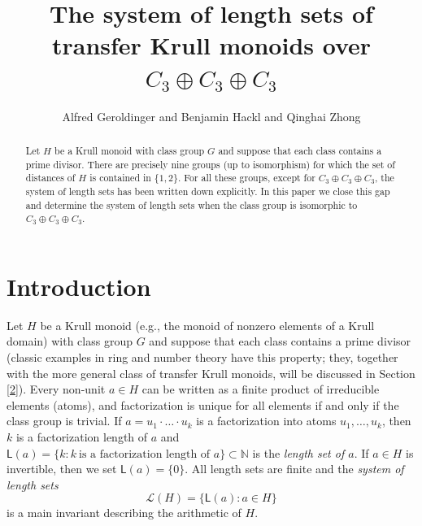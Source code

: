 \documentclass[a4paper, 10pt]{amsart}
\theoremstyle{plain}
\theoremstyle{definition}
\theoremstyle{definition}
\newcommand{\N}{\mathbb N}
\numberwithin{equation}{section}
\begin{document}
\title[The system of  length sets of transfer Krull monoids over $C_3 \oplus C_3 \oplus C_3$]{The system of  length sets of \\ transfer Krull monoids over $C_3 \oplus C_3 \oplus C_3$}

\author{Alfred Geroldinger and  Benjamin Hackl and Qinghai Zhong}

\address{University of Graz, NAWI Graz\\
Department of Mathematics and Scientific Computing\\
Heinrichstra{\ss}e 36\\
8010 Graz, Austria (A.~Geroldinger, B.~Hackl)}

\address{Xidian University \\
Institute of Mathematics and Interdisciplinary Sciences \\
Xi'an, China (Q. Zhong)}



\begin{abstract}
Let $H$ be a Krull monoid with class group $G$ and suppose that each class contains a prime divisor. There are precisely nine groups (up to isomorphism) for which the set of distances of $H$ is contained in $\{1, 2\}$. For all these groups, except for $C_3 \oplus C_3 \oplus C_3$, the system of length sets has been written down explicitly. In this paper we close this gap and determine the system of length sets when the class group is isomorphic to $C_3 \oplus C_3 \oplus C_3$.
\end{abstract}

\maketitle


\smallskip
\section{Introduction} \label{1}
\smallskip


Let $H$ be a Krull monoid (e.g., the monoid of nonzero elements of a Krull domain) with class group $G$ and suppose that each class contains a prime divisor (classic examples in ring and number theory have this property; they, together with the more general class of transfer Krull monoids, will be discussed in Section \ref{2}). 
Every non-unit $a \in H$ can be written as a finite product of irreducible elements (atoms), and factorization is unique for all elements if and only if the class group is trivial.  If  $a = u_1 \cdot \ldots \cdot u_k$ is a factorization into atoms $u_1, \ldots, u_k$, then $k$ is a factorization length of $a$ and $\mathsf L (a) = \{k \colon k \ \text{is a factorization length of $a$} \} \subset \N$ is the {\it length set of $a$}. If $a \in H$ is invertible, then we set $\mathsf L (a) = \{0\}$. All length sets are finite and the {\it system of length sets}
\[
\mathcal L (H) = \{ \mathsf L (a) \colon a \in H\}
\]
is  a main  invariant describing the arithmetic of $H$. 
\end{document}
